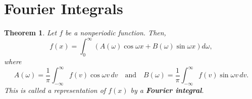 \documentclass[12pt,openany]{book}
\newtheorem{theorem}{Theorem}[chapter]
\theoremstyle{definition}
\begin{document}
	\newpage
	
	\section{Fourier Integrals}
	\begin{tcolorbox}[colframe=thmcolor, title={\color{white}\bf Fourier Integral}]
		\begin{theorem}
			Let \( f \) be a nonperiodic function. Then,
			\[
			f(x) = \int_{0}^{\infty} \left( A(\omega) \cos \omega x + B(\omega) \sin \omega x \right) d\omega,
			\]
			where
			\[
			A(\omega) = \frac{1}{\pi} \int_{-\infty}^{\infty} f(v) \cos \omega v \, dv \quad \text{and} \quad B(\omega) = \frac{1}{\pi} \int_{-\infty}^{\infty} f(v) \sin \omega v \, dv.
			\]
			This is called a representation of \( f(x) \) by a \textbf{Fourier integral}.
		\end{theorem}
	\end{tcolorbox}
\end{document}
